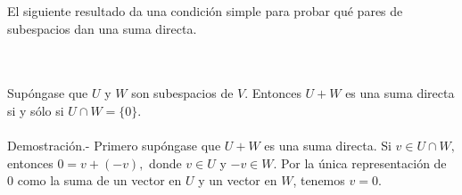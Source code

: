 El siguiente resultado da una condición simple para probar qué pares de subespacios dan una suma directa.

\begin{myteo}\,\\\\
    Supóngase que $U$ y $W$ son subespacios de $V$. Entonces $U+W$ es una suma directa si y sólo si $U \cap W = \lbrace 0 \rbrace$.\\\\
    Demostración.-\; Primero supóngase que $U+W$ es una suma directa. Si $v \in U\cap W,$ entonces $0=v+(-v),$ donde $v\in U$ y $-v\in W$. Por la única representación de $0$ como la suma de un vector en $U$ y un vector en $W$, tenemos $v=0$. 
\end{myteo}
\vspace{.5cm}



\setcounter{mysection}{2}

